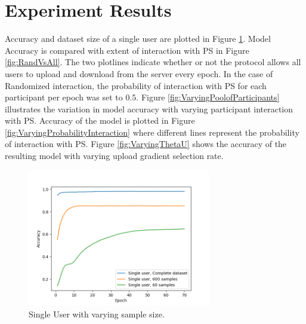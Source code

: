 \documentclass[conference]{IEEEtran}
\begin{document}


\section{Experiment Results}


Accuracy and dataset size of a single user are plotted in Figure \ref{fig:SingleUser}.
Model Accuracy is compared with extent of interaction with PS in Figure \ref{fig:RandVsAll}. The two plotlines indicate whether or not the protocol allows all users to upload and download from the server every epoch. In the case of Randomized interaction, the probability of interaction with PS for each participant per epoch was set to $0.5$.
Figure \ref{fig:VaryingPoolofParticipants} illustrates the variation in model accuracy with varying participant interaction with PS.
Accuracy of the model is plotted in Figure \ref{fig:VaryingProbabilityInteraction} where different lines represent the probability of interaction with PS. Figure \ref{fig:VaryingThetaU} shows the accuracy of the resulting model with varying upload gradient selection rate.


\begin{figure}[!h]
\includegraphics[width=8cm, keepaspectratio]{SingleUserBaselines}
\caption{Single User with varying sample size.}
\label{fig:SingleUser}
\end{figure}
\end{document}

